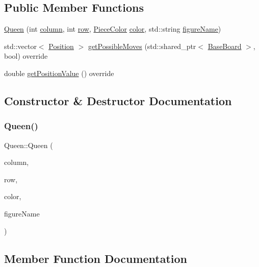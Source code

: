 \subsection*{Public Member Functions}
\begin{DoxyCompactItemize}
\item 
\hyperlink{class_queen_a633fa03d244578e267f373141ceac812}{Queen} (int \hyperlink{class_piece_aa8f39e11280395103164f6ae07398c82}{column}, int \hyperlink{class_piece_ac6ef7c474f20562cb629c2452ce0631d}{row}, \hyperlink{_piece_8h_ad7595c48bb74c0dd2a7648712a2d4985}{Piece\+Color} \hyperlink{class_piece_a8dfe0501fe95a1a7618cf5ad3b9fda69}{color}, std\+::string \hyperlink{class_piece_af2fe809fd0d35d167f2419768e49fd3a}{figure\+Name})
\item 
std\+::vector$<$ \hyperlink{struct_position}{Position} $>$ \hyperlink{class_queen_ab599f550fe04cda1f421e657841022fd}{get\+Possible\+Moves} (std\+::shared\+\_\+ptr$<$ \hyperlink{class_base_board}{Base\+Board} $>$, bool) override
\item 
double \hyperlink{class_queen_aa2ca0d72a74a245470f502a82eaf1052}{get\+Position\+Value} () override
\end{DoxyCompactItemize}


\subsection{Constructor \& Destructor Documentation}
\mbox{\label{class_queen_a633fa03d244578e267f373141ceac812}} 
\subsubsection{\texorpdfstring{Queen()}{Queen()}}
{\footnotesize\ttfamily Queen\+::\+Queen (\begin{DoxyParamCaption}\item[{int}]{column,  }\item[{int}]{row,  }\item[{\hyperlink{_piece_8h_ad7595c48bb74c0dd2a7648712a2d4985}{Piece\+Color}}]{color,  }\item[{std\+::string}]{figure\+Name }\end{DoxyParamCaption})\hspace{0.3cm}{\ttfamily [inline]}}



\subsection{Member Function Documentation}
\mbox{\label{class_queen_aa2ca0d72a74a245470f502a82eaf1052}} 
